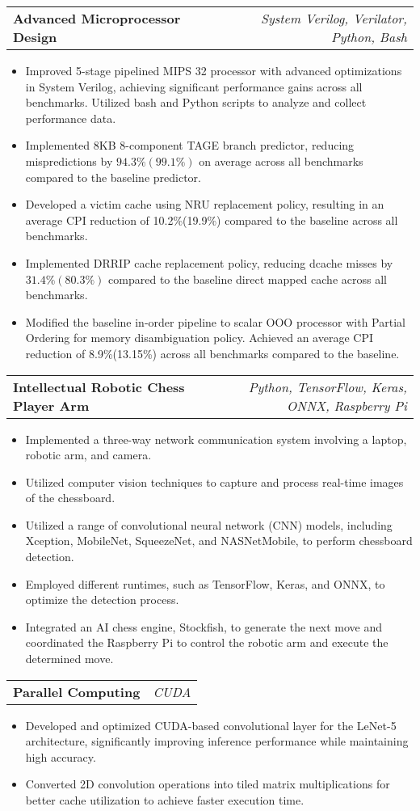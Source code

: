 \documentclass[letterpaper,11pt]{article}
\makeatletter
\newcommand{\resumeItem}[1]{
  \item\small{
    {#1 \vspace{-2pt}}
  }
}
\newcommand{\resumeProjectHeading}[2]{
    \vspace{-2pt}\item
    \begin{tabular*}{0.97\textwidth}{l@{\extracolsep{\fill}}r}
      \textcolor{secondary_color}{\textbf{#1}} & \textcolor{secondary_color}{\textit{\small #2}} \\
    \end{tabular*}\vspace{-7pt}
}
\newcommand{\resumeItemListStart}{\begin{itemize}}
\newcommand{\resumeItemListEnd}{\end{itemize}\vspace{-5pt}}
\makeatother
\begin{document}
      \resumeProjectHeading
      {\textbf{Advanced Microprocessor Design}}{System Verilog, Verilator, Python, Bash}
        \resumeItemListStart
          \resumeItem{Improved 5-stage pipelined MIPS 32 processor with advanced optimizations in System Verilog, achieving significant performance gains across all benchmarks. Utilized bash and Python scripts to analyze and collect performance data.}
          \resumeItem{Implemented 8KB 8-component TAGE branch predictor, reducing mispredictions by \(94.3\%(99.1\%)\) on average across all benchmarks compared to the baseline predictor.}
          \resumeItem{Developed a victim cache using NRU replacement policy, resulting in an average CPI reduction of 10.2\%(19.9\%) compared to the baseline across all benchmarks.}
          \resumeItem{Implemented DRRIP cache replacement policy, reducing dcache misses by \(31.4\%(80.3\%)\) compared to the baseline direct mapped cache across all benchmarks.}
          \resumeItem{Modified the baseline in-order pipeline to scalar OOO processor with Partial Ordering for memory disambiguation policy. Achieved an average CPI reduction of 8.9\%(13.15\%) across all benchmarks compared to the baseline.}
        \resumeItemListEnd

      \resumeProjectHeading
        {\textbf{Intellectual Robotic Chess Player Arm}}{Python, TensorFlow, Keras, ONNX, Raspberry Pi}
          \resumeItemListStart
            \resumeItem{Implemented a three-way network communication system involving a laptop, robotic arm, and camera.}
            \resumeItem{Utilized computer vision techniques to capture and process real-time images of the chessboard.}
            \resumeItem{Utilized a range of convolutional neural network (CNN) models, including Xception, MobileNet, SqueezeNet, and NASNetMobile, to perform chessboard detection.}
            \resumeItem{Employed different runtimes, such as TensorFlow, Keras, and ONNX, to optimize the detection process.}
            \resumeItem{Integrated an AI chess engine, Stockfish, to generate the next move and coordinated the Raspberry Pi to control the robotic arm and execute the determined move.}
          \resumeItemListEnd

      \resumeProjectHeading
        {\textbf{Parallel Computing}}{CUDA}
          \resumeItemListStart
            \resumeItem{Developed and optimized CUDA-based convolutional layer for the LeNet-5 architecture, significantly improving inference performance while maintaining high accuracy.}
            \resumeItem{Converted 2D convolution operations into tiled matrix multiplications for better cache utilization to achieve faster execution time.}
          \resumeItemListEnd
\end{document}
